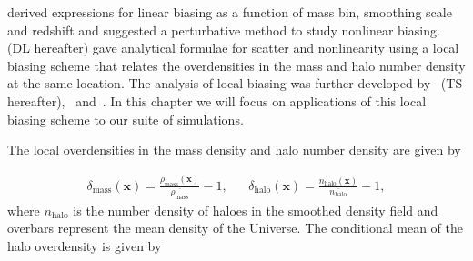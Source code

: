 
\citet{Mo1995} derived expressions for linear biasing as a function of mass bin, smoothing scale and redshift and suggested a perturbative method to study nonlinear biasing. \citealt*{Dekel1999} (DL hereafter) gave analytical formulae for scatter and nonlinearity using a local biasing scheme that relates the overdensities in the mass and halo number density at the same location. The analysis of local biasing was further developed by~\citealt*{Taruya1998} (TS hereafter),~\citet*{Taruya2000} and~\citet{Yoshikawa2001}. In this chapter we will focus on applications of this local biasing scheme to our suite of simulations.


The local overdensities in the mass density and halo number density are given by

\begin{align}
\delta_{\mathrm{mass}}(\mathbf{x}) = \frac{\rho_{\mathrm{mass}} (\mathbf{x})}{\overline{\rho_{\mathrm{mass} } } } -1, && \delta_{\mathrm{halo}}(\mathbf{x}) = \frac{n_{\mathrm{halo}} (\mathbf{x})}{\overline{n_{\mathrm{halo}}}} -1,
\end{align}
where $n_\mathrm{halo}$ is the number density of haloes in the smoothed density field and overbars represent the mean density of the Universe.
The conditional mean of the halo overdensity is given by

